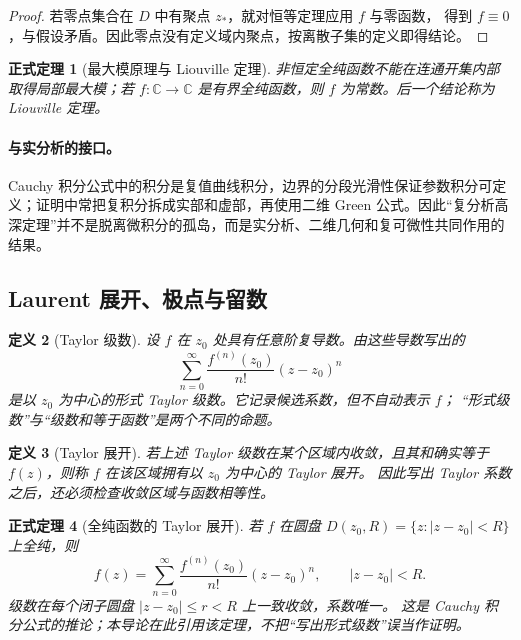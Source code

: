 \documentclass[UTF8,fontset=none,a4paper,11pt]{ctexart}
\theoremstyle{foundation-definition}
\newtheorem{definition}{定义}[section]
\theoremstyle{foundation-theorem}
\newtheorem{theorem}[definition]{正式定理}
\theoremstyle{foundation-proposition}
\theoremstyle{foundation-example}
\theoremstyle{foundation-remark}
\theoremstyle{foundation-theorem}
\newcommand{\C}{\mathbb C}
\begin{document}
\begin{proof}
若零点集合在 \(D\) 中有聚点 \(z_\ast\)，就对恒等定理应用 \(f\) 与零函数，
得到 \(f\equiv0\)，与假设矛盾。因此零点没有定义域内聚点，按离散子集的定义即得结论。
\end{proof}

\begin{theorem}[最大模原理与 Liouville 定理]
非恒定全纯函数不能在连通开集内部取得局部最大模；若 \(f:\C\to\C\) 是有界全纯函数，则 \(f\) 为常数。后一个结论称为 Liouville 定理。
\end{theorem}

\paragraph{与实分析的接口。}
Cauchy 积分公式中的积分是复值曲线积分，边界的分段光滑性保证参数积分可定义；证明中常把复积分拆成实部和虚部，再使用二维 Green 公式。因此“复分析高深定理”并不是脱离微积分的孤岛，而是实分析、二维几何和复可微性共同作用的结果。

\subsection{Laurent 展开、极点与留数}

\begin{definition}[Taylor 级数]\label{def:taylor-series}
设 \(f\) 在 \(z_0\) 处具有任意阶复导数。由这些导数写出的
\[
 \sum_{n=0}^{\infty}\frac{f^{(n)}(z_0)}{n!}(z-z_0)^n
\]
是以 \(z_0\) 为中心的形式 Taylor 级数。它记录候选系数，但不自动表示 \(f\)；
“形式级数”与“级数和等于函数”是两个不同的命题。
\end{definition}

\begin{definition}[Taylor 展开]\label{def:taylor-expansion}
若上述 Taylor 级数在某个区域内收敛，且其和确实等于
\(f(z)\)，则称 \(f\) 在该区域拥有以 \(z_0\) 为中心的 Taylor 展开。
因此写出 Taylor 系数之后，还必须检查收敛区域与函数相等性。
\end{definition}

\begin{theorem}[全纯函数的 Taylor 展开]\label{thm:taylor-expansion}
若 \(f\) 在圆盘 \(D(z_0,R)=\{z:|z-z_0|<R\}\) 上全纯，则
\[
 f(z)=\sum_{n=0}^{\infty}\frac{f^{(n)}(z_0)}{n!}(z-z_0)^n,
 \qquad |z-z_0|<R.
\]
级数在每个闭子圆盘 \(|z-z_0|\le r<R\) 上一致收敛，系数唯一。
这是 Cauchy 积分公式的推论；本导论在此引用该定理，不把“写出形式级数”误当作证明。
\end{theorem}
\end{document}
